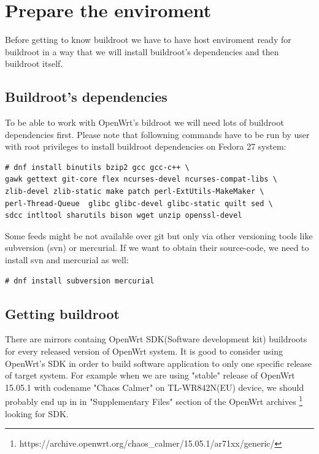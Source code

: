 \section{Prepare the enviroment}

Before getting to know buildroot we have to have host enviroment ready for buildroot in a way that we will install buildroot's dependencies and then buildroot itself.

\subsection{Buildroot's dependencies}

To be able to work with OpenWrt's bildroot we will need lots of buildroot dependencies first.
Please note that followning commands have to be run by user with root privileges to install buildroot dependencies on Fedora 27 system:
\begin{lstlisting}[columns=fixed,basicstyle=\ttfamily\footnotesize,tabsize=4,backgroundcolor=\color{yellow!10}]
# dnf install binutils bzip2 gcc gcc-c++ \
gawk gettext git-core flex ncurses-devel ncurses-compat-libs \
zlib-devel zlib-static make patch perl-ExtUtils-MakeMaker \
perl-Thread-Queue  glibc glibc-devel glibc-static quilt sed \
sdcc intltool sharutils bison wget unzip openssl-devel
\end{lstlisting}
Some feeds might be not available over git but only via other versioning tools like subversion (svn) or mercurial.
If we want to obtain their source-code, we need to install svn and mercurial as well:
\begin{lstlisting}[columns=fixed,basicstyle=\ttfamily\footnotesize,tabsize=4,backgroundcolor=\color{yellow!10}]
# dnf install subversion mercurial
\end{lstlisting}

\subsection{Getting buildroot}

There are mirrors containg OpenWrt SDK(Software development kit) buildroots for every released version of OpenWrt system.
It is good to consider using OpenWrt's SDK in order to build software application to only one specific release of target system.
For example when we are using "stable" release of OpenWrt 15.05.1 with codename "Chaos Calmer" on TL-WR842N(EU) device, we should probably end up in in "Supplementary Files" section of the OpenWrt archives
\footnote{https://archive.openwrt.org/chaos\_calmer/15.05.1/ar71xx/generic/} looking for SDK.

